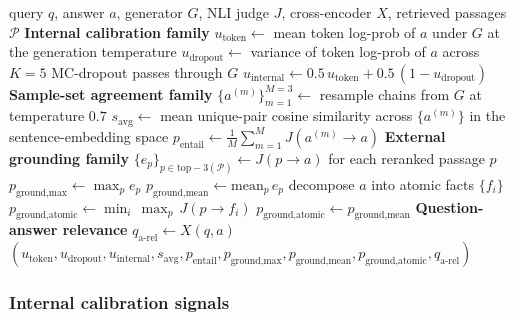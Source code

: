 \begin{algorithm}[!htbp]
\caption[Verifier ensemble (Stage~5).]{Verifier ensemble (Stage~5).}
\label{alg:verifier}
\begin{algorithmic}[1]
\Require query $q$, answer $a$, generator $G$, NLI judge $J$, cross-encoder $X$, retrieved passages $\mathcal{P}$
\Statex \textbf{Internal calibration family}
\State $u_{\text{token}} \gets$ mean token log-prob of $a$ under $G$ at the generation temperature
\State $u_{\text{dropout}} \gets$ variance of token log-prob of $a$ across $K{=}5$ MC-dropout passes through $G$
\State $u_{\text{internal}} \gets 0.5\,u_{\text{token}} + 0.5\,(1-u_{\text{dropout}})$
\Statex \textbf{Sample-set agreement family}
\State $\{a^{(m)}\}_{m=1}^{M=3} \gets$ resample chains from $G$ at temperature $0.7$
\State $s_{\text{avg}} \gets$ mean unique-pair cosine similarity across $\{a^{(m)}\}$ in the sentence-embedding space
\State $p_{\text{entail}} \gets \tfrac{1}{M}\sum_{m=1}^{M} J(a^{(m)} \to a)$
\Statex \textbf{External grounding family}
\State $\{e_{p}\}_{p\in \mathrm{top}{-}3(\mathcal{P})} \gets J(p \to a)$ for each reranked passage $p$
\State $p_{\text{ground,max}} \gets \max_{p} e_{p}$
\State $p_{\text{ground,mean}} \gets \mathrm{mean}_{p}\, e_{p}$
    \State decompose $a$ into atomic facts $\{f_{i}\}$
    \State $p_{\text{ground,atomic}} \gets \min_{i}\, \max_{p}\, J(p \to f_{i})$
\Else
    \State $p_{\text{ground,atomic}} \gets p_{\text{ground,mean}}$ 
\EndIf
\Statex \textbf{Question-answer relevance}
\State $q_{\text{a-rel}} \gets X(q, a)$ 
\State \Return $(u_{\text{token}}, u_{\text{dropout}}, u_{\text{internal}}, s_{\text{avg}}, p_{\text{entail}}, p_{\text{ground,max}}, p_{\text{ground,mean}}, p_{\text{ground,atomic}}, q_{\text{a-rel}})$
\end{algorithmic}
\end{algorithm}

\subsubsection{Internal calibration signals}
\label{sec:verifier-internal}

